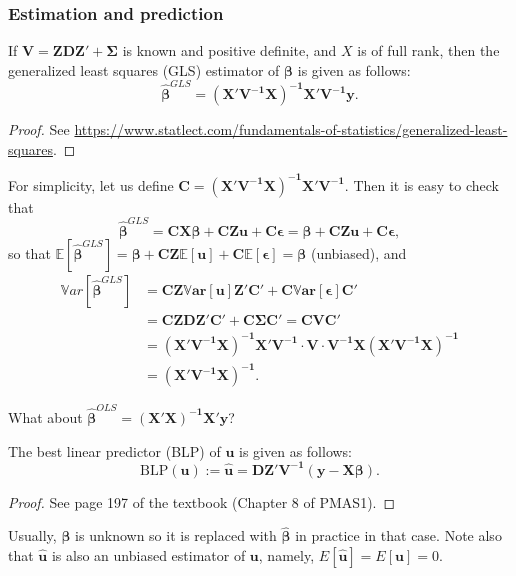 \documentclass[ignorenonframetext,]{beamer}
\begin{document}
\begin{frame}[allowframebreaks]
\frametitle{Estimation and prediction}
\begin{theorem}
If $\bm{V = ZDZ' + \Sigma}$ is known and positive definite, and $X$ is of full rank, then the generalized least squares (GLS) estimator of $\bm{\beta}$ is given as follows:
$$
\hat{\bm{\beta}}^{GLS}=\bm{(X'V^{-1}X)^{-1} X'V^{-1}y}.
$$
\end{theorem}

\begin{proof}
See \url{https://www.statlect.com/fundamentals-of-statistics/generalized-least-squares}.
\end{proof}

\framebreak
For simplicity, let us define $\bm{C = (X'V^{-1}X)^{-1} X'V^{-1}}$. Then it is easy to check that
$$
\hat{\bm{\beta}}^{GLS} = \bm{C X\beta}  + \bm{C Zu} +  \bm{C \epsilon} = \bm{\beta}  + \bm{C Zu} +  \bm{C \epsilon},
$$
so that $\mathbb{E}[\hat{\bm{\beta}}^{GLS}]=\bm{\beta} + \bm{C Z \mathbb{E}[u]} + \bm{C  \mathbb{E}[\epsilon]=\bm\beta} $ (unbiased), and
$$
\begin{aligned}
\mathbb{V}ar[\hat{\bm{\beta}}^{GLS}] &= \bm{C Z \mathbb{V}ar[u] Z' C'} + \bm{C  \mathbb{V}ar[\epsilon] C'} \\
 &=  \bm{C Z D Z' C'} + \bm{C  \Sigma C'}  = \bm{C  V C'}\\
& = \bm{(X'V^{-1}X)^{-1} X'V^{-1} \cdot V  \cdot V^{-1} X(X'V^{-1}X)^{-1} }\\
&=\bm{(X'V^{-1}X)^{-1}}.
\end{aligned}
$$

What about $\hat{\bm{\beta}}^{OLS}=\bm{(X'X)^{-1}X'y}$?

\framebreak

\begin{theorem}
The best linear predictor (BLP) of $\bm{u}$ is given as follows:
$$
\text{BLP}(\bm{u}):=\hat{\bm{u}}=\bm{D Z'V^{-1}(y-X\beta)}.
$$
\end{theorem}

\begin{proof}
See page 197 of the textbook (Chapter 8 of PMAS1).
\end{proof}
Usually, $\bm{\beta}$ is unknown so it is replaced with $\hat{\bm{\beta}}$ in practice in that case. Note also that $\hat{\bm{u}}$ is also an unbiased estimator of $\bm{u}$, namely, $E[\hat{\bm{u}}]=E[\bm{u}]=0$.


\end{frame}
\end{document}
